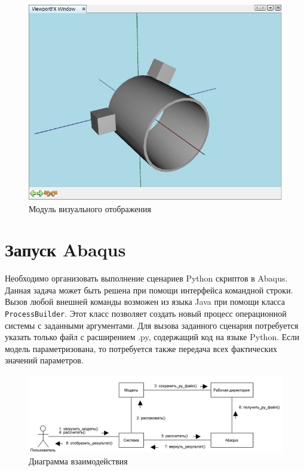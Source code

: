 \documentclass[14pt,oneside,final]{extreport}
\begin{document}
	\begin{figure}[!h]
		\begin{center}
			\includegraphics[scale=0.76]{img/viewport-screen} 
		\end{center}
		\caption{Модуль визуального отображения}
		\label{fig:viewport-screen}
	\end{figure}	 

	\section{Запуск Abaqus}	 
	Необходимо организовать выполнение сценариев Python скриптов в Abaqus. Данная задача может быть решена при помощи интерфейса командной строки. Вызов любой внешней команды возможен из языка Java при помощи класса \texttt{ProcessBuilder}. Этот класс позволяет создать новый процесс операционной системы с заданными аргументами. Для вызова заданного сценария потребуется указать только файл с расширением .py, содержащий код на языке Python. Если модель параметризована, то потребуется также передача всех фактических значений параметров.
		
	\begin{figure}[!h]
		\begin{center}
			\includegraphics[width=1\textwidth]{img/commun-diagram} 
		\end{center}
		\caption{Диаграмма взаимодействия}
		\label{fig:commun-diagram}
	\end{figure}
	
\end{document}
